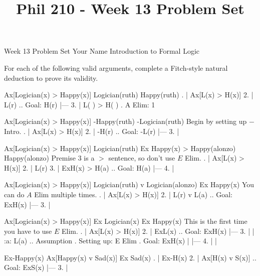 
\title{Phil 210 - Week 13 Problem Set}

\heading
Week 13 Problem Set
Your Name
Introduction to Formal Logic
\endheading

For each of the following valid arguments, complete a Fitch-style natural deduction to prove its validity.

\quantifiers
\problems
{}
\argument
 Ax[Logician(x) > Happy(x)]
 Logician(ruth) 
\argumentline
 Happy(ruth) 
\endargument
        \answer
        . | Ax[L(x) > H(x)]
         2. | L(r)             ..  Goal: H(r)
            |---
         3. | L( ) > H( )      .  A Elim: 1
        \endfitchproof
        \endanswer

\argument
 Ax[Logician(x) > Happy(x)]
 -Happy(ruth) 
\argumentline
 -Logician(ruth) 
\endargument
\Hint Begin by setting up $-$ Intro.
        \answer
        . | Ax[L(x) > H(x)]
         2. | -H(r)             ..  Goal: -L(r)
            |---
         3. | 
        \endfitchproof
        \endanswer

\argument
 Ax[Logician(x) > Happy(x)]
 Logician(ruth)
 Ex Happy(x) > Happy(alonzo)
\argumentline
 Happy(alonzo) 
\endargument
\Hint Premise 3 is a $>$ sentence, so don't use $E$ Elim.
        \answer
        . | Ax[L(x) > H(x)]
         2. | L(r)
         3. | ExH(x) > H(a)    ..  Goal: H(a)
            |---
         4. |
        \endfitchproof
        \endanswer

\argument
 Ax[Logician(x) > Happy(x)]
 Logician(ruth) v Logician(alonzo)
\argumentline
 Ex Happy(x)
\endargument
\Hint You can do $A$ Elim multiple times.
        \answer
        . | Ax[L(x) > H(x)]
         2. | L(r) v L(a)      ..  Goal: ExH(x)
            |---
         3. | 
        \endfitchproof
        \endanswer

\argument
 Ax[Logician(x) > Happy(x)]
 Ex Logician(x)
\argumentline
 Ex Happy(x)
\endargument
\Hint This is the first time you have to use $E$ Elim.
        \answer
        . | Ax[L(x) > H(x)]
         2. | ExL(x)           ..  Goal: ExH(x)
            |---
         3. |   | :a: L(a)     ..  Assumption  .  Setting up: E Elim  .  Goal: ExH(x)
            |   |---
         4. |   |
        \endfitchproof
        \endanswer

\argument
 Ex-Happy(x)
 Ax[Happy(x) v Sad(x)]
\argumentline
 Ex Sad(x)
\endargument
        \answer
        . | Ex-H(x)
         2. | Ax[H(x) v S(x)]  ..  Goal: ExS(x)
            |---
         3. | 
        \endfitchproof
        \endanswer

\endproblems
\bye
